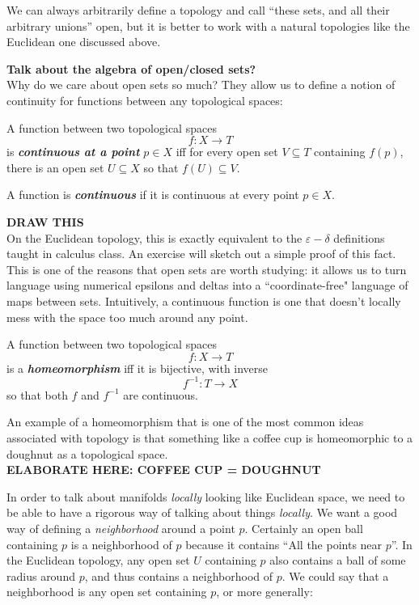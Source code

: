 	We can always arbitrarily define a topology and call ``these sets, and all their  arbitrary unions'' open, but it is better to work with a natural topologies like the Euclidean one discussed above.
	
	
	\textbf{Talk about the algebra of open/closed sets?}\\
	
	
	Why do we care about open sets so much? They allow us to define a notion of continuity for functions between any topological spaces:
	
	\begin{defn}[Continuity]\label{def:Continuity}
		A function between two topological spaces $$f: X \rightarrow T$$ is \textbf{\emph{continuous at a point}}  $p \in X$ iff for every open set $V\subseteq T$ containing $f(p)$, there is an open set $U \subseteq X$ so that $f(U) \subseteq V$.
		
		
		A function is \textbf{\emph{continuous}} if it is continuous at every point $p \in X$.
	\end{defn}
	\textbf{DRAW THIS}\\
	
	On the Euclidean topology, this is exactly equivalent to the $\varepsilon-\delta$ definitions taught in calculus class. An exercise will sketch out a simple proof of this fact. This is one of the reasons that open sets are worth studying: it allows us to turn language using numerical epsilons and deltas into a ``coordinate-free" language of maps between sets. Intuitively, a continuous function is one that doesn't locally mess with the space too much around any point. 
	
	\begin{defn}[Homeomorphism]\label{def:Homeomorphism}
		A function between two topological spaces $$f: X \rightarrow T$$ is a \textbf{\emph{homeomorphism}} iff it is bijective, with inverse $$f^{-1}: T \rightarrow X$$ so that both $f$ and $f^{-1}$ are continuous.
	\end{defn}
	
	An example of a homeomorphism that is one of the most common ideas associated with topology is that something like a coffee cup is homeomorphic to a doughnut as a topological space. \\
	\textbf{ELABORATE HERE: COFFEE CUP = DOUGHNUT}
	
	In order to talk about manifolds \emph{locally} looking like Euclidean space, we need to be able to have a rigorous way of talking about things \emph{locally}. We want a good way of defining a \emph{neighborhood} around a point $p$. Certainly an open ball containing $p$ is a neighborhood of $p$ because it contains ``All the points near $p$''. In the Euclidean topology, any open set $U$ containing $p$ also contains a ball of some radius around $p$, and thus contains a neighborhood of $p$. We could say that a neighborhood is any open set containing $p$, or more generally:
	
